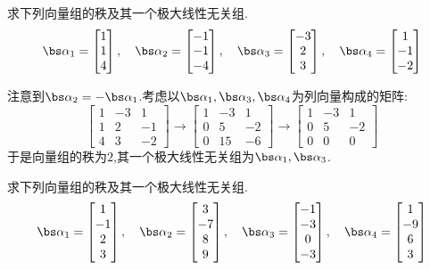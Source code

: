 \documentclass{ctexart}
\begin{document}
\begin{homework}[2(2)]
    求下列向量组的秩及其一个极大线性无关组.
    \[\bs\alpha_1=\begin{bmatrix}
        1\\1\\4
    \end{bmatrix},\quad\bs\alpha_2=\begin{bmatrix}
        -1\\-1\\-4
    \end{bmatrix},\quad\bs\alpha_3=\begin{bmatrix}
        -3\\2\\3
    \end{bmatrix},\quad\bs\alpha_4=\begin{bmatrix}
        1\\-1\\-2
    \end{bmatrix}\]
\end{homework}
\begin{solution}
    注意到$\bs\alpha_2=-\bs\alpha_1$.考虑以$\bs\alpha_1,\bs\alpha_3,\bs\alpha_4$为列向量构成的矩阵:
    \[\begin{bmatrix}
        1&-3&1\\
        1&2&-1\\
        4&3&-2
    \end{bmatrix}\longrightarrow\begin{bmatrix}
        1&-3&1\\
        0&5&-2\\
        0&15&-6
    \end{bmatrix}\longrightarrow\begin{bmatrix}
        1&-3&1\\
        0&5&-2\\
        0&0&0
    \end{bmatrix}\]
    于是向量组的秩为$2$,其一个极大线性无关组为$\bs\alpha_1,\bs\alpha_3$.
\end{solution}
\begin{homework}[2(3)]
    求下列向量组的秩及其一个极大线性无关组.
    \[\bs\alpha_1=\begin{bmatrix}
        1\\-1\\2\\3
    \end{bmatrix},\quad\bs\alpha_2=\begin{bmatrix}
        3\\-7\\8\\9
    \end{bmatrix},\quad\bs\alpha_3=\begin{bmatrix}
        -1\\-3\\0\\-3
    \end{bmatrix},\quad\bs\alpha_4=\begin{bmatrix}
        1\\-9\\6\\3
    \end{bmatrix}\]
\end{homework}
\end{document}
